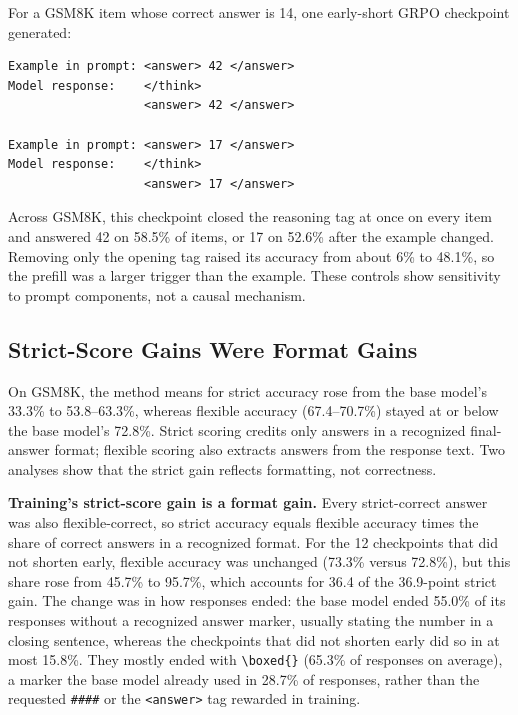 \documentclass[ai,article,submit,oneauthor]{Definitions/mdpi}
\begin{document}
For a GSM8K item whose correct answer is 14, one early-short GRPO checkpoint generated:
{\footnotesize
\begin{verbatim}
Example in prompt: <answer> 42 </answer>
Model response:    </think>
                   <answer> 42 </answer>

Example in prompt: <answer> 17 </answer>
Model response:    </think>
                   <answer> 17 </answer>
\end{verbatim}
}
Across GSM8K, this checkpoint closed the reasoning tag at once on every item and answered 42 on 58.5\% of items, or 17 on 52.6\% after the example changed. Removing only the opening tag raised its accuracy from about 6\% to 48.1\%, so the prefill was a larger trigger than the example. These controls show sensitivity to prompt components, not a causal mechanism.

\subsection{Strict-Score Gains Were Format Gains}\label{sec:format_coverage}

On GSM8K, the method means for strict accuracy rose from the base model's 33.3\% to 53.8--63.3\%, whereas flexible accuracy (67.4--70.7\%) stayed at or below the base model's 72.8\%. Strict scoring credits only answers in a recognized final-answer format; flexible scoring also extracts answers from the response text. Two analyses show that the strict gain reflects formatting, not correctness.

\noindent\textbf{Training's strict-score gain is a format gain.}
Every strict-correct answer was also flexible-correct, so strict accuracy equals flexible accuracy times the share of correct answers in a recognized format. For the 12 checkpoints that did not shorten early, flexible accuracy was unchanged (73.3\% versus 72.8\%), but this share rose from 45.7\% to 95.7\%, which accounts for 36.4 of the 36.9-point strict gain. The change was in how responses ended: the base model ended 55.0\% of its responses without a recognized answer marker, usually stating the number in a closing sentence, whereas the checkpoints that did not shorten early did so in at most 15.8\%. They mostly ended with \texttt{\textbackslash boxed\{\}} (65.3\% of responses on average), a marker the base model already used in 28.7\% of responses, rather than the requested \texttt{\#\#\#\#} or the \texttt{<answer>} tag rewarded in training.
\end{document}
